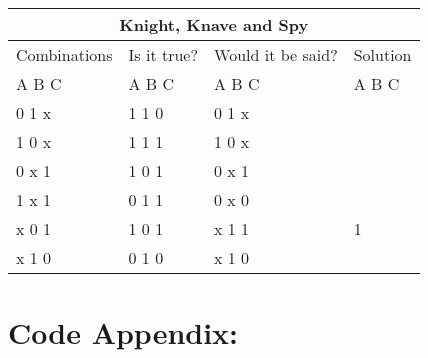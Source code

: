 \documentclass[11pt]{amsart}
\begin{document}
\begin{tabular}{ |p{3cm}||p{3cm}|p{3cm}|p{3cm}|  }
	\hline
	\multicolumn{4}{|c|}{Knight, Knave and Spy} \\
	\hline
	 Combinations & Is it true? & Would it be said? & Solution  \\ A  B  C   &   A  B  C  &   A  B  C & A  B  C \\
	\hline
	  0   1   x  	& 1	1	0   & 0 1 x	&  \\
	  1   0   x		& 1	1	1  	& 1 0 x &  \\
	  0   x   1 	&	1	0	1 	& 0 x 1	&  \\
	  1   x   1  	&	0	1	1 	& 0 x 0	&  \\
	  x   0   1		& 1	0	1  	& x 1 1	& 1\\
	  x   1   0		& 0	1	0  	& x 1 0 &  \\

	\hline
\end{tabular}


\section{Code Appendix:}
\end{document}
